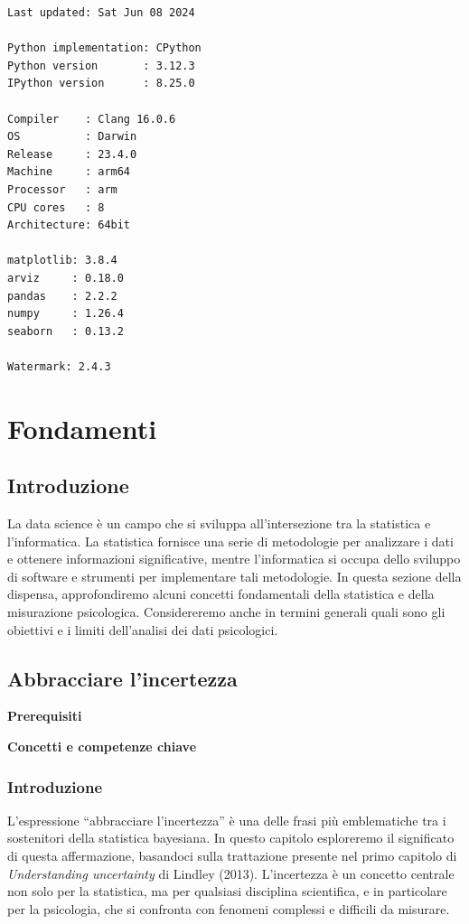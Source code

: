 \documentclass[
  letterpaper,
  krantz2]{{[}./krantz{]}}
\begin{document}
\begin{verbatim}
Last updated: Sat Jun 08 2024

Python implementation: CPython
Python version       : 3.12.3
IPython version      : 8.25.0

Compiler    : Clang 16.0.6 
OS          : Darwin
Release     : 23.4.0
Machine     : arm64
Processor   : arm
CPU cores   : 8
Architecture: 64bit

matplotlib: 3.8.4
arviz     : 0.18.0
pandas    : 2.2.2
numpy     : 1.26.4
seaborn   : 0.13.2

Watermark: 2.4.3
\end{verbatim}

\part{Fondamenti}

\chapter*{Introduzione}\label{introduzione-2}


La data science è un campo che si sviluppa all'intersezione tra la
statistica e l'informatica. La statistica fornisce una serie di
metodologie per analizzare i dati e ottenere informazioni significative,
mentre l'informatica si occupa dello sviluppo di software e strumenti
per implementare tali metodologie. In questa sezione della dispensa,
approfondiremo alcuni concetti fondamentali della statistica e della
misurazione psicologica. Considereremo anche in termini generali quali
sono gli obiettivi e i limiti dell'analisi dei dati psicologici.

\chapter{Abbracciare l'incertezza}\label{sec-ucertainty}

\textbf{Prerequisiti}

\textbf{Concetti e competenze chiave}

\section{Introduzione}\label{introduzione-3}

L'espressione ``abbracciare l'incertezza'' è una delle frasi più
emblematiche tra i sostenitori della statistica bayesiana. In questo
capitolo esploreremo il significato di questa affermazione, basandoci
sulla trattazione presente nel primo capitolo di \emph{Understanding
uncertainty} di Lindley (2013). L'incertezza è un concetto centrale non
solo per la statistica, ma per qualsiasi disciplina scientifica, e in
particolare per la psicologia, che si confronta con fenomeni complessi e
difficili da misurare.
\end{document}
